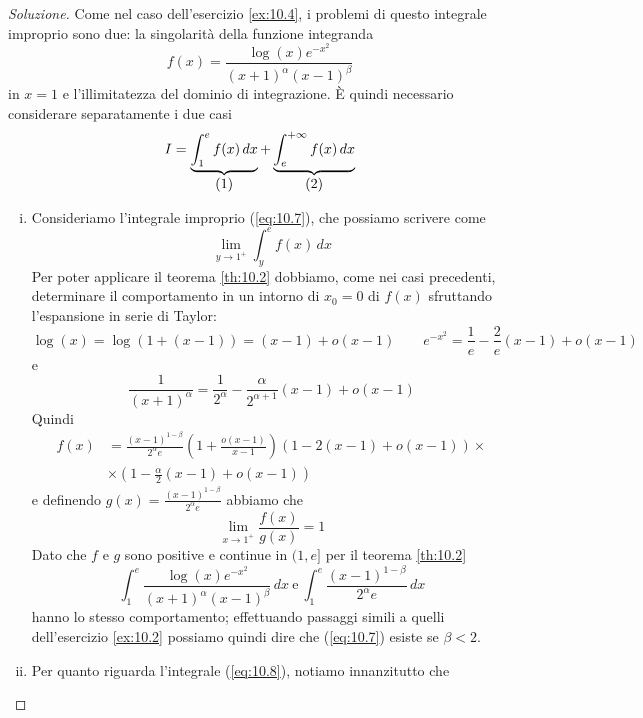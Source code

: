 \begin{proof}[Soluzione]
    Come nel caso dell'esercizio \ref{ex:10.4}, i problemi di questo integrale improprio sono due: la singolarità della funzione integranda
    \[
    f(x) = \frac{\log(x)e^{-x^2}}{(x+1)^{\alpha}(x-1)^\beta}
    \]
    in $x=1$ e l'illimitatezza del dominio di integrazione. \`E quindi necessario considerare separatamente i due casi
    \[
    I = \underbrace{\int_1^e f(x)\, dx}_{\stepcounter{equation}\mbox{(\theequation)}} + \underbrace{\int_e^{+\infty}f(x)\, dx}_{\stepcounter{equation}\mbox{(\theequation)}}
    \]
    \addtocounter{equation}{-2}\label{eq:10.7}
    \addtocounter{equation}{0}\label{eq:10.8}
    \begin{enumerate}[(i)]
        \item Consideriamo l'integrale improprio (\ref{eq:10.7}), che possiamo scrivere come
        \[
        \lim_{y\to 1^+} \int_y^e f(x)\, dx
        \]
        Per poter applicare il teorema \ref{th:10.2} dobbiamo, come nei casi precedenti, determinare il comportamento in un intorno di $x_0=0$ di $f(x)$ sfruttando l'espansione in serie di Taylor:
        \[
        \log(x)=\log(1+(x-1))= (x-1)+o(x-1) \qquad e^{-x^2} = \frac{1}{e} -\frac{2}{e}(x-1) +o(x-1)
        \]
        e
        \[
        \frac{1}{(x+1)^\alpha} = \frac{1}{2^\alpha } -\frac{\alpha}{2^{\alpha+1}}(x-1) +o(x-1)
        \]
        Quindi
        \[
        \begin{split}
            f(x) & = \frac{(x-1)^{1-\beta}}{2^{\alpha}e}\left(1+\frac{o(x-1)}{x-1}\right)\left(1-2(x-1)+o(x-1)\right)\times \\
            & \times \left(1-\frac{\alpha}{2}(x-1)+o(x-1)\right)
        \end{split}
        \]
        e definendo $g(x) = \frac{(x-1)^{1-\beta}}{2^{\alpha}e}$ abbiamo che
        \[
        \lim_{x\to 1^+} \frac{f(x)}{g(x)} = 1
        \]
        Dato che $f$ e $g$ sono positive e continue in $(1, e]$ per il teorema \ref{th:10.2} 
        \[
        \int_1^e \frac{\log(x)e^{-x^2}}{(x+1)^\alpha(x-1)^\beta}\, dx \ \text{e} \ \int_1^e \frac{(x-1)^{1-\beta}}{2^{\alpha}e}\, dx
        \]
        hanno lo stesso comportamento; effettuando passaggi simili a quelli dell'esercizio \ref{ex:10.2} possiamo quindi dire che (\ref{eq:10.7}) esiste se $\beta<2$.
        \item Per quanto riguarda l'integrale (\ref{eq:10.8}), notiamo innanzitutto che 
        \begin{equation}
            \label{eq:10.9}

\end{equation}
\end{enumerate}
\end{proof}
